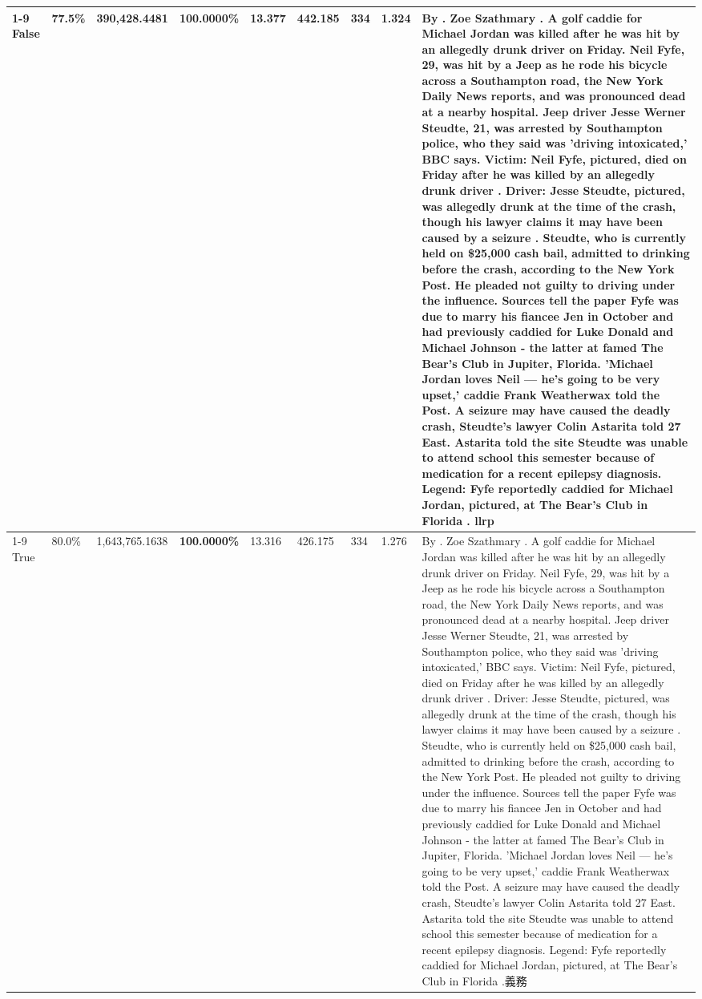 \begin{table}[H]
\begin{tabular}{lllrlllll}
\cline{1-9}
False & 77.5\% & 390,428.4481 & \bfseries \color{red} 100.0000\% & 13.377 & 442.185 & 334 & 1.324 & By . Zoe Szathmary . A golf caddie for Michael Jordan was killed after he was hit by an allegedly drunk driver on Friday. Neil Fyfe, 29, was hit by a Jeep as he rode his bicycle across a Southampton road, the New York Daily News reports, and was pronounced dead at a nearby hospital. Jeep driver Jesse Werner Steudte, 21, was arrested by Southampton police, who they said was 'driving intoxicated,' BBC says. Victim: Neil Fyfe, pictured, died on Friday after he was killed by an allegedly drunk driver . Driver: Jesse Steudte, pictured, was allegedly drunk at the time of the crash, though his lawyer claims it may have been caused by a seizure . Steudte, who is currently held on \$25,000 cash bail, admitted to drinking before the crash, according to the New York Post. He pleaded not guilty to driving under the influence. Sources tell the paper Fyfe was due to marry his fiancee Jen in October and had previously caddied for Luke Donald and Michael Johnson - the latter at famed The Bear's Club in Jupiter, Florida. 'Michael Jordan loves Neil — he’s going to be very upset,' caddie Frank Weatherwax told the Post. A seizure may have caused the deadly crash, Steudte's lawyer Colin Astarita told 27 East. Astarita told the site Steudte was unable to attend school this semester because of medication for a recent epilepsy diagnosis. Legend: Fyfe reportedly caddied for Michael Jordan, pictured, at The Bear's Club in Florida . llrp \\
\cline{1-9}
True & 80.0\% & 1,643,765.1638 & \bfseries \color{red} 100.0000\% & 13.316 & 426.175 & 334 & 1.276 & By . Zoe Szathmary . A golf caddie for Michael Jordan was killed after he was hit by an allegedly drunk driver on Friday. Neil Fyfe, 29, was hit by a Jeep as he rode his bicycle across a Southampton road, the New York Daily News reports, and was pronounced dead at a nearby hospital. Jeep driver Jesse Werner Steudte, 21, was arrested by Southampton police, who they said was 'driving intoxicated,' BBC says. Victim: Neil Fyfe, pictured, died on Friday after he was killed by an allegedly drunk driver . Driver: Jesse Steudte, pictured, was allegedly drunk at the time of the crash, though his lawyer claims it may have been caused by a seizure . Steudte, who is currently held on \$25,000 cash bail, admitted to drinking before the crash, according to the New York Post. He pleaded not guilty to driving under the influence. Sources tell the paper Fyfe was due to marry his fiancee Jen in October and had previously caddied for Luke Donald and Michael Johnson - the latter at famed The Bear's Club in Jupiter, Florida. 'Michael Jordan loves Neil — he’s going to be very upset,' caddie Frank Weatherwax told the Post. A seizure may have caused the deadly crash, Steudte's lawyer Colin Astarita told 27 East. Astarita told the site Steudte was unable to attend school this semester because of medication for a recent epilepsy diagnosis. Legend: Fyfe reportedly caddied for Michael Jordan, pictured, at The Bear's Club in Florida .義務 \\

\end{tabular}
\end{table}
